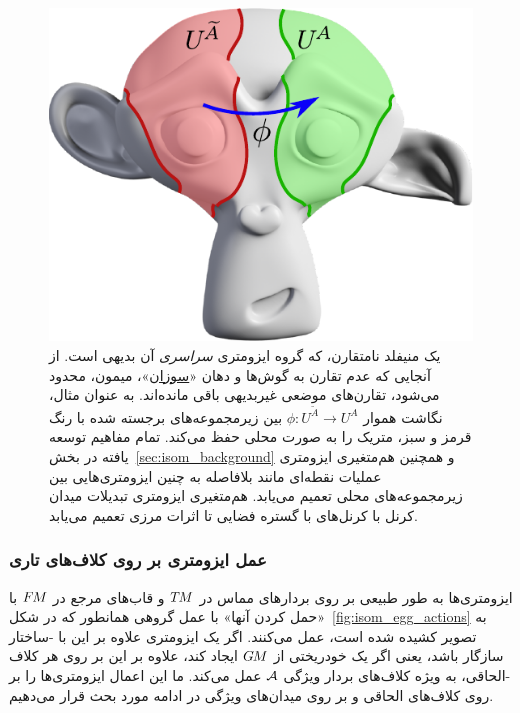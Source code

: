 \begin{figure}
    \centering
    \hspace{1.ex}
    \includegraphics[width=.42\textwidth]{figures/suzanne_local_isometry.pdf}
    \hspace{2.ex}
    \captionsetup{width=.89\textwidth}
    \caption[]{\small
        یک منیفلد نامتقارن، که گروه ایزومتری \emph{سراسری} آن بدیهی است.
        از آنجایی که عدم تقارن به گوش‌ها و دهان
        «\href{https://en.wikipedia.org/wiki/Blender_(software)\#Suzanne}{سوزان}»،
        میمون، محدود می‌شود، تقارن‌های موضعی غیربدیهی باقی مانده‌اند.
        به عنوان مثال، نگاشت هموار ${\phi: U^{\widetilde{A}} \to U^A}$ بین زیرمجموعه‌های برجسته شده با رنگ قرمز و سبز، متریک را به صورت محلی حفظ می‌کند.
        تمام مفاهیم توسعه یافته در بخش~\ref{sec:isom_background} و همچنین هم‌متغیری ایزومتری عملیات نقطه‌ای مانند \onexones بلافاصله به چنین ایزومتری‌هایی بین زیرمجموعه‌های محلی تعمیم می‌یابد. 
        هم‌متغیری ایزومتری تبدیلات میدان کرنل با کرنل‌های با گستره فضایی تا اثرات مرزی تعمیم می‌یابد.
        }
    \label{fig:suzanne_local_isometry}
\end{figure}











\subsubsection{عمل ایزومتری بر روی کلاف‌های تاری}
\label{sec:isom_action_bundles}

ایزومتری‌ها به طور طبیعی بر روی بردارهای مماس در $T\mkern-1.5muM$ و قاب‌های مرجع در $F\mkern-1.5muM$ با «حمل کردن آنها» با عمل گروهی همانطور که در شکل~\ref{fig:isom_egg_actions} به تصویر کشیده شده است، عمل می‌کنند.
اگر یک ایزومتری علاوه بر این با -ساختار سازگار باشد، یعنی اگر یک خودریختی از $G\mkern-1.4muM$ ایجاد کند، علاوه بر این بر روی هر کلاف -الحاقی، به ویژه کلاف‌های بردار ویژگی $\mathcal{A}$ عمل می‌کند.
ما این اعمال ایزومتری‌ها را بر روی کلاف‌های الحاقی و بر روی میدان‌های ویژگی در ادامه مورد بحث قرار می‌دهیم.



